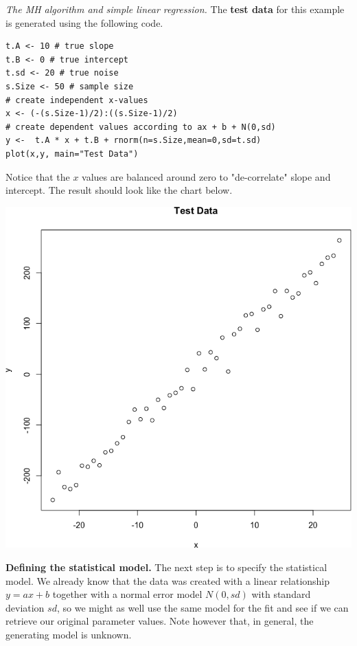 \begin{Example} \textit{The MH algorithm and simple linear regression.} The \textbf{test data} for this example is generated using the following code. 
\begin{lstlisting}
t.A <- 10 # true slope
t.B <- 0 # true intercept
t.sd <- 20 # true noise
s.Size <- 50 # sample size
# create independent x-values 
x <- (-(s.Size-1)/2):((s.Size-1)/2)
# create dependent values according to ax + b + N(0,sd)
y <-  t.A * x + t.B + rnorm(n=s.Size,mean=0,sd=t.sd)
plot(x,y, main="Test Data")
\end{lstlisting}
\noindent Notice that the $x$ values are balanced around zero to "de-correlate" slope and intercept.  The result should look like the chart below.  
\begin{center}
\includegraphics[width=\linewidth]{Images/example9a.png}
\end{center}

 
\item \textbf{Defining the statistical model.} The next step is to specify the statistical model. We already know that the data was created with a linear relationship $y = ax + b$ together with a  normal error model $N(0,sd)$ with standard deviation $sd$, so we might as well use the same model for the fit and see if we can retrieve our original parameter values. Note however that, in general, the generating model is unknown.



\end{Example}

